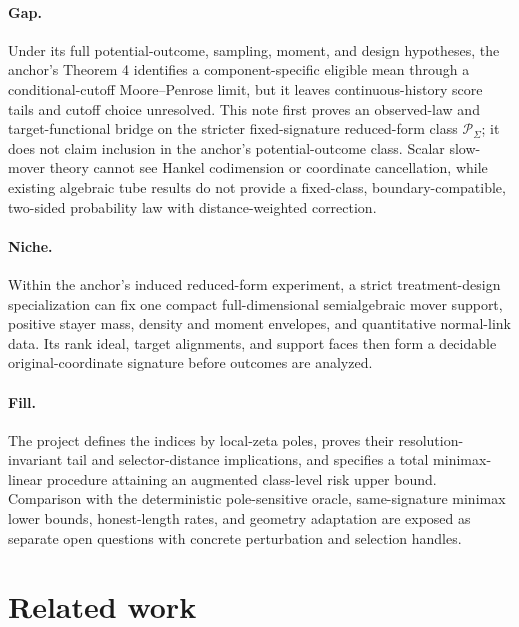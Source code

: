 \documentclass{article}
\begin{document}
\paragraph{Gap.} Under its full potential-outcome, sampling, moment, and design hypotheses, the anchor's Theorem 4 identifies a component-specific eligible mean through a conditional-cutoff Moore--Penrose limit, but it leaves continuous-history score tails and cutoff choice unresolved. This note first proves an observed-law and target-functional bridge on the stricter fixed-signature reduced-form class \(\mathcal P_\Sigma\); it does not claim inclusion in the anchor's potential-outcome class. Scalar slow-mover theory cannot see Hankel codimension or coordinate cancellation, while existing algebraic tube results do not provide a fixed-class, boundary-compatible, two-sided probability law with distance-weighted correction.

\paragraph{Niche.} Within the anchor's induced reduced-form experiment, a strict treatment-design specialization can fix one compact full-dimensional semialgebraic mover support, positive stayer mass, density and moment envelopes, and quantitative normal-link data. Its rank ideal, target alignments, and support faces then form a decidable original-coordinate signature before outcomes are analyzed.

\paragraph{Fill.} The project defines the indices by local-zeta poles, proves their resolution-invariant tail and selector-distance implications, and specifies a total minimax-linear procedure attaining an augmented class-level risk upper bound. Comparison with the deterministic pole-sensitive oracle, same-signature minimax lower bounds, honest-length rates, and geometry adaptation are exposed as separate open questions with concrete perturbation and selection handles.

\section{Related work}
\end{document}
